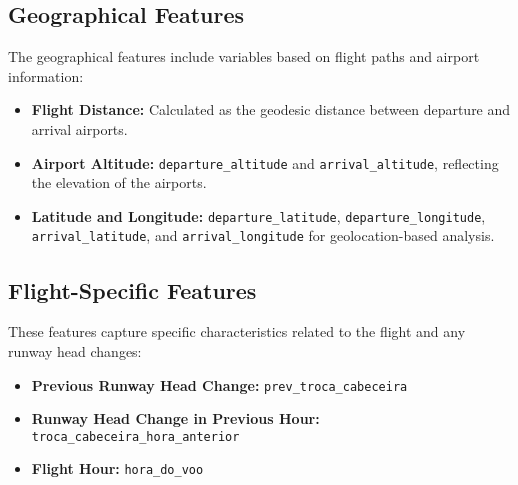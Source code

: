 \subsection{Geographical Features} The geographical features include
variables based on flight paths and airport information:

\begin{itemize}
    \item \textbf{Flight Distance:} Calculated as the geodesic
    distance between departure and arrival airports.
    \item \textbf{Airport Altitude:} \texttt{departure\_altitude} and
    \texttt{arrival\_altitude}, reflecting the elevation of the
    airports.
    \item \textbf{Latitude and Longitude:}
    \texttt{departure\_latitude}, \texttt{departure\_longitude},
    \texttt{arrival\_latitude}, and \texttt{arrival\_longitude} for
    geolocation-based analysis.
\end{itemize}

\subsection{Flight-Specific Features} These features capture specific
characteristics related to the flight and any runway head changes:

\begin{itemize}
    \item \textbf{Previous Runway Head Change:}
    \texttt{prev\_troca\_cabeceira}
    \item \textbf{Runway Head Change in Previous Hour:}
    \texttt{troca\_cabeceira\_hora\_anterior}
    \item \textbf{Flight Hour:} \texttt{hora\_do\_voo}
\end{itemize}




